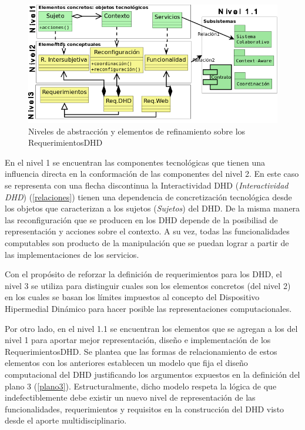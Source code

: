 \begin{descrition}
\begin{definition}
\begin{figure}
\begin{center}
 \includegraphics[width=5 in,totalheight=4 in] {DHD/RequerimientosDHD}
   \caption{Niveles de abstracción y elementos de refinamiento sobre
los RequerimientosDHD} \label{fig: RequerimientosDHD}
\end{center}
\end{figure}


En el nivel 1 se encuentran las componentes tecnológicas que tienen una
influencia directa en la conformación de las componentes del nivel 2. En este
caso se representa con una flecha discontinua la Interactividad DHD
(\textit{Interactividad DHD}) (\ref{relaciones}) tienen una  dependencia de
concretización tecnológica desde los objetos que caracterizan a los sujetos
(\textit{Sujetos}) del DHD. De la misma manera las reconfiguración
que se producen en los DHD depende de la posibiliad de representación y
acciones sobre el contexto. A su vez, todas las funcionalidades computables son
producto de la manipulación que se puedan lograr a partir de las
implementaciones de los servicios.  

Con el propósito de reforzar la definición de requerimientos para los DHD,
el nivel 3 se utiliza para distinguir cuales son los elementos concretos (del
nivel 2) en los cuales se basan los límites impuestos al concepto del Dispositivo Hipermedial
Dinámico para hacer posible las representaciones computacionales. 

Por otro lado, en el nivel 1.1 se encuentran los elementos que se agregan a los
del nivel 1 para aportar mejor representación, diseño e implementación de
los RequerimientosDHD. Se plantea que las formas de relacionamiento de estos elementos con los anteriores establecen un modelo que fija el diseño
computacional del DHD justificando los argumentos expuestos en la definición del plano 3
(\ref{plano3}). Estructuralmente, dicho modelo respeta la lógica de que
indefectiblemente debe existir un nuevo nivel de representación de las
funcionalidades, requerimientos y requisitos en la construcción del DHD visto desde el aporte multidisciplinario.


\end{definition}
\end{descrition}
